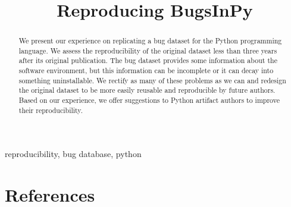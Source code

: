 \documentclass[conference]{IEEEtran}
\begin{document}
\title{Reproducing BugsInPy}

\author{
\and
{}
\and
{}
}

\maketitle

\begin{abstract}
  We present our experience on replicating a bug dataset for the Python programming language.
  We assess the reproducibility of the original dataset less than three years after its original publication.
  The bug dataset provides some information about the software environment, but this information can be incomplete or it can decay into something uninstallable.
  We rectify as many of these problems as we can and redesign the original dataset to be more easily reusable and reproducible by future authors.
  Based on our experience, we offer suggestions to Python artifact authors to improve their reproducibility. 
\end{abstract}

\begin{IEEEkeywords}
reproducibility, bug database, python
\end{IEEEkeywords}




\section*{References}

\printbibliography
\end{document}
